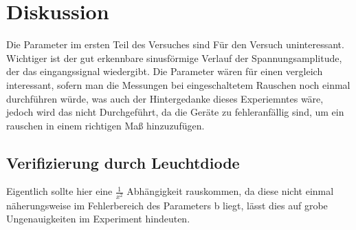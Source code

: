 \section{Diskussion}
\label{sec:Diskussion}
Die Parameter im ersten Teil des Versuches sind Für den Versuch uninteressant. Wichtiger ist der gut erkennbare 
sinusförmige Verlauf der Spannungsamplitude, der das eingangssignal wiedergibt. Die Parameter 
wären für einen vergleich interessant, sofern man die Messungen bei eingeschaltetem Rauschen 
noch einmal durchführen würde, was auch der Hintergedanke dieses Experiemntes wäre, jedoch wird 
das nicht Durchgeführt, da die Geräte zu fehleranfällig sind, um ein rauschen in einem richtigen Maß
hinzuzufügen. 

\subsection{Verifizierung durch Leuchtdiode}
Eigentlich sollte hier eine $\frac{1}{x^2}$ Abhängigkeit rauskommen, da diese nicht einmal 
näherungsweise im Fehlerbereich des Parameters b liegt, lässt dies auf grobe Ungenauigkeiten
im Experiment hindeuten.